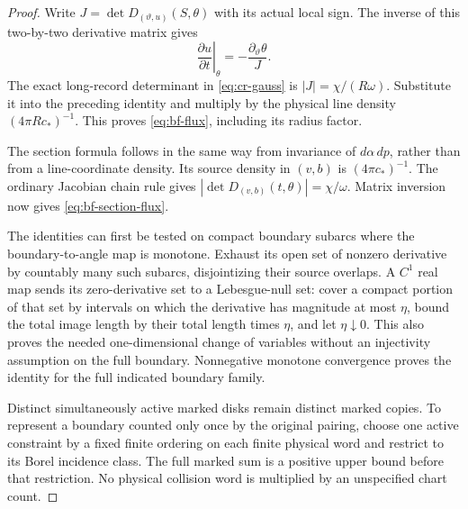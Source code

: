 \begin{proof}
Write $J=\det D_{(\vartheta,u)}(S,\theta)$ with its actual local sign.
The inverse of this two-by-two derivative matrix gives
\[
 \left.\frac{\partial u}{\partial t}\right|_\theta
       =-\frac{\partial_\vartheta\theta}{J}.
\]
The exact long-record determinant in \eqref{eq:cr-gauss} is
$|J|=\chi/(R\omega)$.  Substitute it into the preceding identity
and multiply by the physical line density $(4\pi Rc_*)^{-1}$.
This proves \eqref{eq:bf-flux}, including its radius factor.

The section formula follows in the same way from invariance of
$d\alpha\,dp$, rather than from a line-coordinate density.  Its
source density in $(v,b)$ is $(4\pi c_*)^{-1}$.  The ordinary
Jacobian chain rule gives $|\det D_{(v,b)}(t,\theta)|=\chi/\omega$.
Matrix inversion now gives \eqref{eq:bf-section-flux}.

The identities can first be tested on compact boundary subarcs where
the boundary-to-angle map is monotone.  Exhaust its open set of
nonzero derivative by countably many such subarcs, disjointizing their
source overlaps.  A $C^1$ real map sends its zero-derivative set to a
Lebesgue-null set: cover a compact portion of that set by intervals
on which the derivative has magnitude at most $\eta$, bound the
total image length by their total length times $\eta$, and let
$\eta\downarrow0$.  This also proves the needed one-dimensional
change of variables without an injectivity assumption on the full
boundary.  Nonnegative monotone convergence proves the identity for
the full indicated boundary family.

Distinct simultaneously active marked disks remain distinct marked
copies.  To represent a boundary counted only once by the original
pairing, choose one active constraint by a fixed finite ordering on
each finite physical word and restrict to its Borel incidence class.
The full marked sum is a positive upper bound before that restriction.
No physical collision word is multiplied by an unspecified chart count.
\end{proof}

